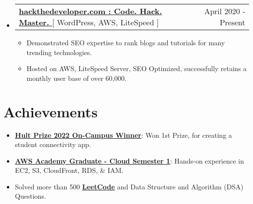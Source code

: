 \documentclass[letterpaper,11pt]{article}
\makeatletter
\newcommand{\resumeItem}[1]{
  \item\small{
    {#1 \vspace{-2pt}}
  }
}
\newcommand{\resumeProjectHeading}[2]{
    \item
    \begin{tabular*}{0.97\textwidth}{l@{\extracolsep{\fill}}r}
      \small#1 & #2 \\
    \end{tabular*}\vspace{-7pt}
}
\newcommand{\resumeSubHeadingListStart}{\begin{itemize}[leftmargin=0.15in, label={}]}
\newcommand{\resumeSubHeadingListEnd}{\end{itemize}}
\newcommand{\resumeItemListStart}{\begin{itemize}}
\newcommand{\resumeItemListEnd}{\end{itemize}\vspace{-5pt}}
\makeatother
\begin{document}
    \resumeSubHeadingListStart
      \resumeProjectHeading
          {\textbf{\href{https://hackthedeveloper.com} {hackthedeveloper.com : Code. Hack. Master. }}{[ WordPress, AWS, LiteSpeed ]}}{ April 2020 - Present}
          \resumeItemListStart
           \resumeItem{Demonstrated SEO expertise to rank blogs and tutorials for many trending technologies.}
           \resumeItem{Hosted on AWS, LiteSpeed Server, SEO Optimized, successfully retains a monthly user base of over 60,000.}
          \resumeItemListEnd
    \resumeSubHeadingListEnd

\section{Achievements}
 \begin{itemize}[leftmargin=0.15in, label={}]
    \small{\item{
        \resumeItemListStart
            \resumeItem{\textbf{\href{https://www.linkedin.com/posts/dshekhar17_hultprize2022-hultprizekiit-kiituniversity-activity-6899007358467743746-6hZ3}{Hult Prize 2022 On-Campus Winner}}: Won 1st Prize, for creating a student connectivity app.}

            \resumeItem{\textbf{\href{https://www.credly.com/go/vqTzHzec}{AWS Academy Graduate - Cloud Semester 1}}: Hands-on experience in EC2, S3, CloudFront, RDS, \& IAM.}

            \resumeItem{Solved more than 500 \textbf{\href{https://leetcode.com/dshekhar17/}{LeetCode}} and Data Structure and Algorithm (DSA) Questions.}
            
      \resumeItemListEnd
      
    }}
 \end{itemize}

%
\end{document}
